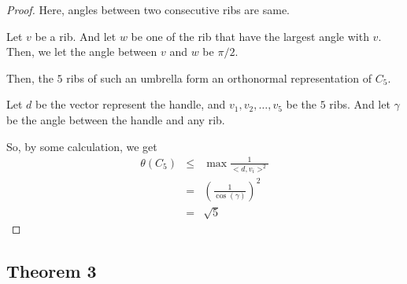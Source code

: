 \documentclass{beamer}
\begin{document}
                  \begin{frame}
                        \begin{proof}
                              Here, angles between two consecutive ribs are same. 
                              
                              Let $v$ be a rib. And let $w$ be one of the rib that have the largest angle with $v$. Then, we let the angle between $v$ and $w$ be $ \pi/2 $.
                  
                              Then, the $5$ ribs of such an umbrella form an orthonormal representation of $C_{5}$.
                  
                              Let $d$ be the vector represent the handle, and $v_{1},v_{2},\dots,v_{5}$ be the $5$ ribs. And let $\gamma$ be the angle between the handle and any rib.
                  
                              So, by some calculation, we get
                              \begin{eqnarray}
                                    \theta(C_{5}) &\le& \max \frac{1}{<d,v_{i}>^{2}} \\
                                    &=& \left(
                                          \frac{1}{\cos(\gamma)}
                                    \right)^{2} \\
                                    &=& \sqrt{5}
                              \end{eqnarray}
                        \end{proof}
                  \end{frame}
                  
            \subsection{Theorem 3}
                  
\end{document}
